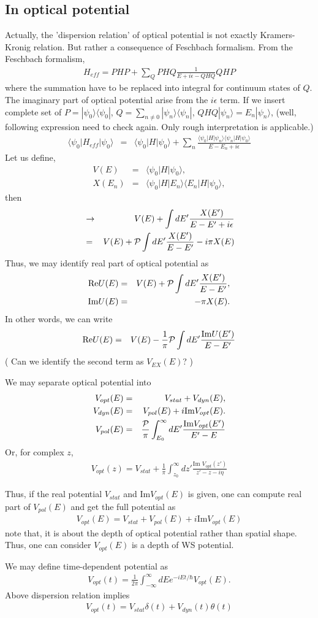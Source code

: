 \documentclass[11pt]{book}
\def\la{\langle}
\def\ra{\rangle}
\newcommand{\bea}{\begin{eqnarray}}
\newcommand{\eea}{\end{eqnarray}}
\newcommand{\no}{\nonumber \\}
\begin{document}
\subsection{In optical potential}
Actually, the 'dispersion relation' of optical potential is not exactly Kramers-Kronig relation. But rather a consequence of Feschbach formalism. 
From the Feschbach formalism,
\bea 
H_{eff} = PH P + \sum_{Q} P HQ\frac{1}{E+i\epsilon-QHQ}QHP 
\eea 
where the summation have to be replaced into integral for continuum states of $Q$. 
The imaginary part of optical potential arise from the $i\epsilon$ term.  
If we insert complete set of 
$P=|\psi_0\ra\la \psi_0|$,
$Q=\sum_{n\neq 0}|\psi_n\ra \la \psi_n|  $, $QHQ|\psi_n\ra = E_n|\psi_n\ra$,
(well, following expression need to check again.
Only rough interpretation is applicable.)
\bea 
\la \psi_0|H_{eff}|\psi_0\ra &=& \la \psi_0|H|\psi_0\ra 
 +\sum_{n}\frac{\la \psi_0|H|\psi_n\ra\la\psi_n|H|\psi_0\ra}{E-E_n+i\epsilon}
\eea 
Let us define,
\bea 
V(E)&=&\la \psi_0|H|\psi_0\ra,\no 
X(E_n)&=& \la \psi_0|H|E_n\ra\la E_n|H|\psi_0\ra,
\eea 
then
\bea  
  &\to& V(E)
  +\int d E' \frac{X(E')}{E-E'+i\epsilon}\no 
  &=& V(E) 
     +{\cal P}  \int d E' \frac{X(E')}{E-E'}
     -i\pi X(E) 
\eea 
Thus, we may identify real part of optical potential as
\bea 
{\rm Re}U(E) &=& V(E)+{\cal P}  \int d E' \frac{X(E')}{E-E'},\no 
{\rm Im}U(E) &=& -\pi X(E).
\eea 
In other words, we can write 
\bea 
{\rm Re}U(E) &=& V(E)-\frac{1}{\pi}{\cal P}  \int d E' \frac{ {\rm Im}U(E')}{E-E'}
\eea 
( Can we identify the second term as $V_{EX}(E)$? ) 

We may separate optical potential into 
\bea 
V_{opt}(E)&=&V_{stat}+V_{dyn}(E),\no
V_{dyn}(E)&=& V_{pol}(E)+ i \mbox{Im} V_{opt}(E).\no 
V_{pol}(E)&=& \frac{\cal P}{\pi} \int_{E_0}^\infty d E' \frac{\mbox{Im} V_{opt}(E')}{E'-E}
\eea 
Or, for complex $z$,
\bea 
V_{opt}(z)=V_{stat}+\frac{1}{\pi}\int_{z_0}^\infty dz' \frac{\mbox{Im } V_{opt}(z')}{z'-z-i\eta}
\eea 

Thus, if the real potential $V_{stat}$ and Im$V_{opt}(E)$ is given, 
one can compute real part of $V_{pol}(E)$ and get the full potential as 
\bea 
V_{opt}(E)=V_{stat}+V_{pol}(E)+i \mbox{Im} V_{opt}(E)
\eea 
note that, it is about the depth of optical potential rather than spatial shape. 
Thus, one can consider $V_{opt}(E)$ is a depth of WS potential. 

We may define time-dependent potential as
\bea 
V_{opt}(t)=\frac{1}{2\pi}\int_{-\infty}^\infty d E e^{-iEt/\hbar}V_{opt}(E).
\eea 
Above dispersion relation implies 
\bea 
V_{opt}(t)=V_{stat}\delta(t)+V_{dyn}(t)\theta(t) 
\eea 
\end{document}
